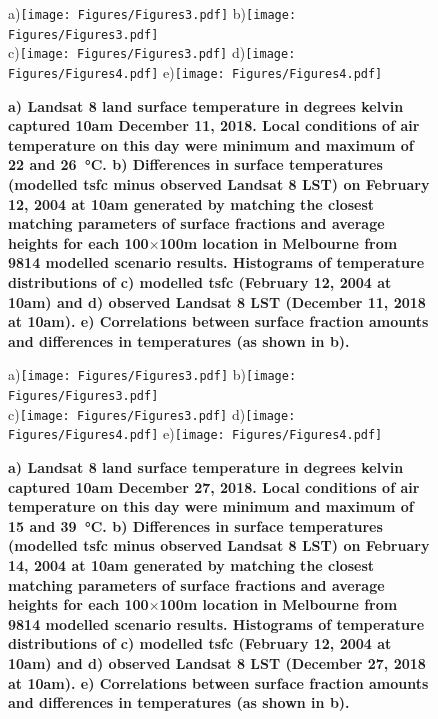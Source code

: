 \documentclass[final,3p,times,authoryear]{elsarticle}
\begin{document}
\begin{figure}
\centering
a)\texttt{[image: Figures/Figures3.pdf]}
b)\texttt{[image: Figures/Figures3.pdf]}\\
c)\texttt{[image: Figures/Figures3.pdf]}
d)\texttt{[image: Figures/Figures4.pdf]}
e)\texttt{[image: Figures/Figures4.pdf]}
\caption{\bf a) Landsat 8 land surface temperature in degrees kelvin captured 10am December 11, 2018. Local conditions of air temperature on this day were minimum and maximum of 22 and 26\SI{}{\degreeCelsius}. b) Differences in surface temperatures (modelled \gls{tsfc} minus observed Landsat 8 LST) on February 12, 2004 at 10am generated by matching the closest matching parameters of surface fractions and average heights for each 100$\times$100m location in Melbourne from 9814 modelled scenario results. Histograms of temperature distributions of c) modelled \gls{tsfc} (February 12, 2004 at 10am) and d) observed Landsat 8 LST (December 11, 2018 at 10am). e) Correlations between surface fraction amounts and differences in temperatures (as shown in b).}
 \label{fig:Melb_TSFC12_85}
\end{figure}


\begin{figure}
\centering
a)\texttt{[image: Figures/Figures3.pdf]}
b)\texttt{[image: Figures/Figures3.pdf]}\\
c)\texttt{[image: Figures/Figures3.pdf]}
d)\texttt{[image: Figures/Figures4.pdf]}
e)\texttt{[image: Figures/Figures4.pdf]}
\caption{\bf a) Landsat 8 land surface temperature in degrees kelvin captured 10am December 27, 2018. Local conditions of air temperature on this day were minimum and maximum of 15 and 39\SI{}{\degreeCelsius}. b) Differences in surface temperatures (modelled \gls{tsfc} minus observed Landsat 8 LST) on February 14, 2004 at 10am generated by matching the closest matching parameters of surface fractions and average heights for each 100$\times$100m location in Melbourne from 9814 modelled scenario results. Histograms of temperature distributions of c) modelled \gls{tsfc} (February 12, 2004 at 10am) and d) observed Landsat 8 LST (December 27, 2018 at 10am). e) Correlations between surface fraction amounts and differences in temperatures (as shown in b).}
 \label{fig:Melb_TSFC14_85}
\end{figure}
\end{document}
